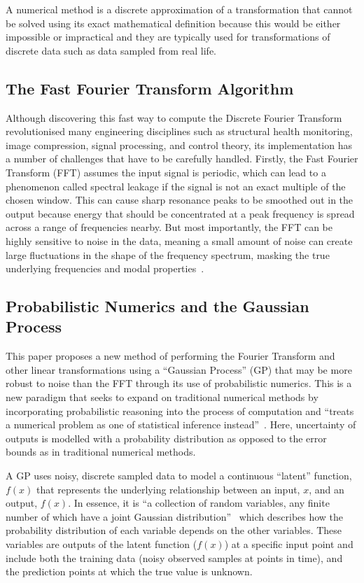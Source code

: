 \documentclass[12pt]{article}
\begin{document}
    A numerical method is a discrete approximation of a transformation that cannot be solved using its exact mathematical definition because this would be either impossible or impractical and they are typically used for transformations of discrete data such as data sampled from real life.

    \subsection{The Fast Fourier Transform Algorithm}
    Although discovering this fast way to compute the Discrete Fourier Transform revolutionised many engineering disciplines such as structural health monitoring, image compression, signal processing, and control theory\cite{Byjus2023}, its implementation has a number of challenges that have to be carefully handled.
    Firstly, the Fast Fourier Transform (FFT) assumes the input signal is periodic, which can lead to a phenomenon called spectral leakage if the signal is not an exact multiple of the chosen window\cite{MathStackExchange2023}.
    This can cause sharp resonance peaks to be smoothed out in the output because energy that should be concentrated at a peak frequency is spread across a range of frequencies nearby.
    But most importantly, the FFT can be highly sensitive to noise in the data, meaning a small amount of noise can create large fluctuations in the shape of the frequency spectrum, masking the true underlying frequencies and modal properties~\cite{MathStackExchange2023}.

    \subsection{Probabilistic Numerics and the Gaussian Process}
    This paper proposes a new method of performing the Fourier Transform and other linear transformations using a ``Gaussian Process'' (GP) that may be more robust to noise than the FFT through its use of probabilistic numerics.
    This is a new paradigm that seeks to expand on traditional numerical methods by incorporating probabilistic reasoning into the process of computation and ``treats a numerical problem as one of statistical inference instead''~\cite{ProbabilisticNumerics2023}.
    Here, uncertainty of outputs is modelled with a probability distribution as opposed to the error bounds as in traditional numerical methods.

    A GP uses noisy, discrete sampled data to model a continuous ``latent'' function, $f(x)$ that represents the underlying relationship between an input, $x$, and an output, $f(x)$.
    In essence, it is ``a collection of random variables, any finite number of which have a joint Gaussian distribution''~\cite{rasmussen2006gaussian} which describes how the probability distribution of each variable depends on the other variables.
    These variables are outputs of the latent function ($f(x)$) at a specific input point and include both the training data (noisy observed samples at points in time), and the prediction points at which the true value is unknown.
\end{document}
